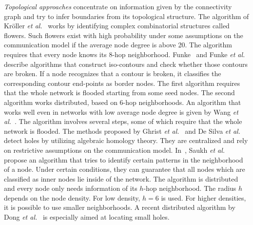 \documentclass{llncs}
\begin{document}
\emph{Topological approaches} concentrate on information given by the connectivity graph and try to infer boundaries from its topological structure.
The algorithm of Kr\"oller \emph{et al.}~\cite{kfpf-dbrte-06} works by identifying complex combinatorial structures called flowers.
Such flowers exist with high probability under some assumptions on the communication model if the average node degree is above 20.
The algorithm requires that every node knows its $8$-hop neighborhood.
Funke~\cite{f05} and Funke \emph{et al.}~\cite{fk06} describe algorithms that construct iso-contours and check whether those contours are broken.
If a node recognizes that a contour is broken, it classifies the corresponding contour end-points as border nodes.
The first algorithm requires that the whole network is flooded starting from some seed nodes.
The second algorithm works distributed, based on $6$-hop neighborhoods.
An algorithm that works well even in networks with low average node degree is given by Wang \emph{et al.}~\cite{wgm06}.
The algorithm involves several steps, some of which require that the whole network is flooded.
The methods proposed by Ghrist \emph{et al.}~\cite{ghrist05} and De Silva \emph{et al.}~\cite{ghrist06} detect holes by utilizing algebraic homology theory.
They are centralized and rely on restrictive assumptions on the communication model.
In~\cite{saukh08,saukh10}, Saukh \emph{et al.} propose an algorithm that tries to identify certain patterns in the neighborhood of a node.
Under certain conditions, they can guarantee that all nodes which are classified as inner nodes lie inside of the network.
The algorithm is distributed and every node only needs information of its $h$-hop neighborhood.
The radius $h$ depends on the node density. For low density, $h=6$ is used. For higher densities, it is possible to use
smaller neighborhoods.
A recent distributed algorithm by Dong \emph{et al.}~\cite{dll09} is especially aimed at locating small holes.
\end{document}
